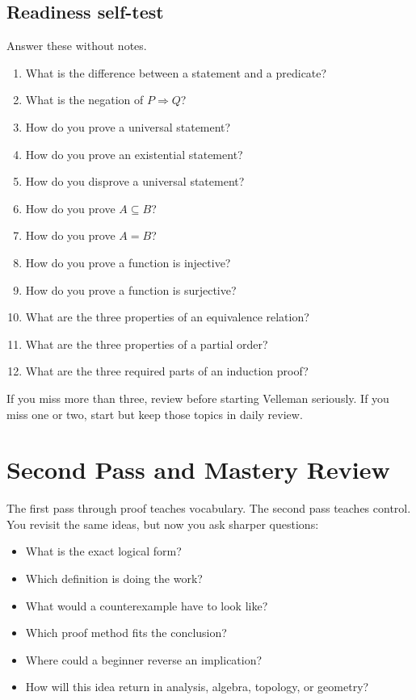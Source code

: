 \subsection{Readiness self-test}

Answer these without notes.

\begin{enumerate}
\item What is the difference between a statement and a predicate?
\item What is the negation of $P\Rightarrow Q$?
\item How do you prove a universal statement?
\item How do you prove an existential statement?
\item How do you disprove a universal statement?
\item How do you prove $A\subseteq B$?
\item How do you prove $A=B$?
\item How do you prove a function is injective?
\item How do you prove a function is surjective?
\item What are the three properties of an equivalence relation?
\item What are the three properties of a partial order?
\item What are the three required parts of an induction proof?
\end{enumerate}

If you miss more than three, review before starting Velleman seriously. If you miss one or two, start but keep those topics in daily review.

\section{Second Pass and Mastery Review}
\chapterline

The first pass through proof teaches vocabulary. The second pass teaches control. You revisit the same ideas, but now you ask sharper questions:

\begin{itemize}
\item What is the exact logical form?
\item Which definition is doing the work?
\item What would a counterexample have to look like?
\item Which proof method fits the conclusion?
\item Where could a beginner reverse an implication?
\item How will this idea return in analysis, algebra, topology, or geometry?
\end{itemize}

